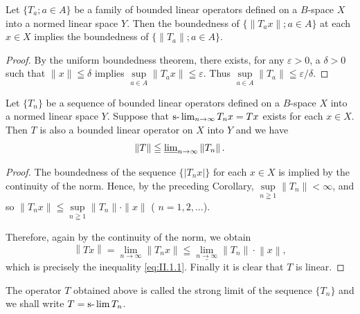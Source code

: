\begin{corollary}\label{cor:II.1.Corollary.1} Let $\{T_{a}; a \in A\}$ be a family of bounded linear operators defined on a $B$-space $X$ into a normed linear space $Y$. Then the boundedness of $\{\| T_{a}x\|; a \in A\}$ at each $x \in X$ implies the boundedness of $\{ \| T_{a}\|; a \in A\}$. 
\end{corollary}

\begin{proof}
 By the uniform boundedness theorem, there exists, for any $\varepsilon > 0$, a $\delta > 0$ such that $\|x\| \leqq \delta$ implies $\sup\limits_{a \in A} \|T_a x\| \leqq \varepsilon$. Thus $\sup\limits_{a \in A} \|T_a\| \leqq \varepsilon / \delta$. 
\end{proof}

\begin{corollary}\label{cor:II.1.Corollary.2} Let $\{T_n\}$ be a sequence of bounded linear operators defined on a $B$-space $X$ into a normed linear space $Y$. Suppose that $\slim\limits_{n\to \infty}T_n x = Tx$ exists for each $x\in X$. Then $T$ is also a bounded linear operator on $X$ into $Y$ and we have 
\begin{equation}\label{eq:II.1.1}
\left\| T \right\| \leqq \varliminf\limits_{n \rightarrow \infty} \left\| T _{n} \right\|.
\end{equation}
\end{corollary}

\begin{proof}
 The boundedness of the sequence $\{|T_{n}x|\}$ for each $x\in X$ is implied by the continuity of the norm. Hence, by the preceding Corollary, $\sup\limits_{n\geqq1}\|T_{n}\|<\infty$, and so $\|T_{n}x\|\leqq\sup\limits_{n\geqq1}\|T_{n}\|\cdot\|x\|$ ( $n=1,2,\ldots$). 

Therefore, again by the continuity of the norm, we obtain 
\[
\left\| T x \right\| = \lim\limits _{n \rightarrow \infty} \left\| T _{n} x \right\| \leqq \underline {{\lim\limits _{n \rightarrow \infty}}} \left\| T _{n} \right\| \cdot \left\| x \right\|,
\]
which is precisely the inequality \eqref{eq:II.1.1}. Finally it is clear that $T$ is linear. 
\end{proof}

\begin{definitionu} The operator $T$ obtained above is called the strong limit of the sequence $\{T_n\}$ and we shall write $T = \slim T_n$. 
\end{definitionu}

